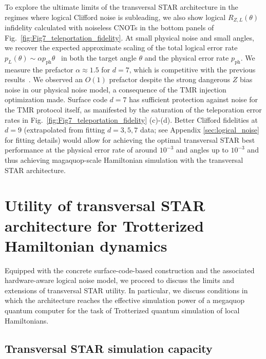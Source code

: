 \documentclass[aps, prx, reprint, superscriptaddress, longbibliography, floatfix]{revtex4-2}
\begin{document}
To explore the ultimate limits of the transversal STAR architecture in the regimes where logical Clifford noise is subleading, we also show logical $R_{Z,L}(\theta)$ infidelity calculated with noiseless CNOTs in the bottom panels of Fig.~\ref{fig:Fig7_teleportation_fidelity}. At small physical noise and small angles, we recover the expected approximate scaling of the total logical error rate $p_L(\theta)\sim \alpha p_{\mathrm{ph}}\theta$~\cite{Toshio2024} in both the target angle $\theta$ and the physical error rate $p_{\mathrm{ph}}$. We measure the prefactor $\alpha \approx1.5$ for $d=7$, which is competitive with the previous results~\cite{Toshio2024}. We observed an $O(1)$ prefactor despite the strong dangerous $Z$ bias noise in our physical noise model, a consequence of the TMR injection optimization made. Surface code $d=7$ has sufficient protection against noise for the TMR protocol itself, as manifested by the saturation of the teleporation error rates in  Fig.~\ref{fig:Fig7_teleportation_fidelity} (c)-(d). Better Clifford fidelities at $d=9$ (extrapolated from fitting $d=3,5,7$ data; see Appendix \ref{sec:logical_noise} for fitting details) would allow for achieving the optimal transversal STAR best performance at the physical error rate of around $10^{-3}$ and angles up to $10^{-3}$ and thus achieving magaquop-scale Hamiltonian simulation with the transversal STAR architecture. 

\section{Utility of transversal STAR architecture for Trotterized Hamiltonian dynamics}
\label{sec:disc_utility}

 Equipped with the concrete surface-code-based construction and the associated hardware-aware logical noise model, we proceed to discuss the limits and extensions of transversal STAR utility. In particular, we discuss conditions in which the architecture reaches the effective simulation power of a megaquop quantum computer for the task of Trotterized quantum simulation of local Hamiltonians.

 \subsection{Transversal STAR simulation capacity}
\label{sec:sim_capacity}
\end{document}
